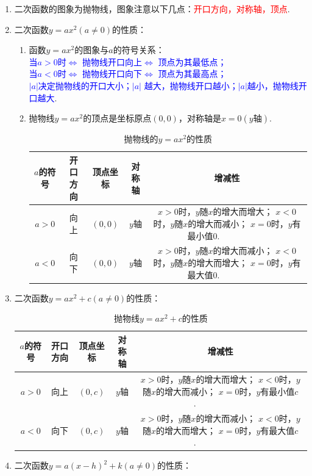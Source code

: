 \documentclass[10pt]{ctexart}
\newcommand{\abs}[1]{\left| #1 \right|}
\begin{document}
\begin{enumerate}
\item 二次函数的图象为抛物线，图象注意以下几点：\textcolor{red}{开口方向，对称轴，顶点}.
\item 二次函数$y=ax^2(a\neq 0)$的性质：
\begin{enumerate}[(1)]
\item 函数$y=ax^2$的图象与$a$的符号关系：\\
\textcolor{blue}{ 当$a>0$时$\Leftrightarrow$ 抛物线开口向上$\Leftrightarrow$ 顶点为其最低点；\\
 当$a<0$时$\Leftrightarrow$ 抛物线开口向下$\Leftrightarrow$ 顶点为其最高点；\\
 $\abs{a}$决定抛物线的开口大小；$\abs{a}$ 越大，抛物线开口越小；$\abs{a}$越小，抛物线开口越大}.
\item 抛物线$y=ax^2$的顶点是坐标原点$(0,0)$，对称轴是$x=0(y\text{轴})$.

\begin{table}[h]
\centering
\caption{抛物线的$y=ax^2$的性质}
\begin{tabular}{|c|c|c|c|c|}
\hline
$a$的符号&开口方向&顶点坐标&对称轴&增减性\\ \hline
$a>0$&向上&$(0,0)$&$y$轴&\makecell{$x>0$时，$y$随$x$的增大而增大；\\$x<0$时，$y$随$x$的增大而减小；\\$x=0$时，$y$有最小值$0$.~~~~~~~~~~~}\\ \hline
$a<0$&向下&$(0,0)$&$y$轴&\makecell{$x>0$时，$y$随$x$的增大而减小；\\$x<0$时，$y$随$x$的增大而增大；\\$x=0$时，$y$有最大值$0$.~~~~~~~~~~~}\\ \hline
\end{tabular}
\end{table}
\end{enumerate}
\item 二次函数$y=ax^2+c(a\neq 0)$的性质：

\begin{table}[h]
\centering
\caption{抛物线$y=ax^2+c$的性质}
\begin{tabular}{|c|c|c|c|c|}
\hline
$a$的符号&开口方向&顶点坐标&对称轴&增减性\\ \hline
$a>0$&向上&$(0,c)$&$y$轴&\makecell{$x>0$时，$y$随$x$的增大而增大；\\$x<0$时，$y$随$x$的增大而减小；\\$x=0$时，$y$有最小值$c$.~~~~~~~~~~~~}\\ \hline
$a<0$&向下&$(0,c)$&$y$轴&\makecell{$x>0$时，$y$随$x$的增大而减小；\\$x<0$时，$y$随$x$的增大而增大；\\$x=0$时，$y$有最大值$c$.~~~~~~~~~~~~}\\ \hline
\end{tabular}
\end{table}
\item 二次函数$y=a(x-h)^2+k(a\neq 0)$的性质：


\end{enumerate}
\end{document}
